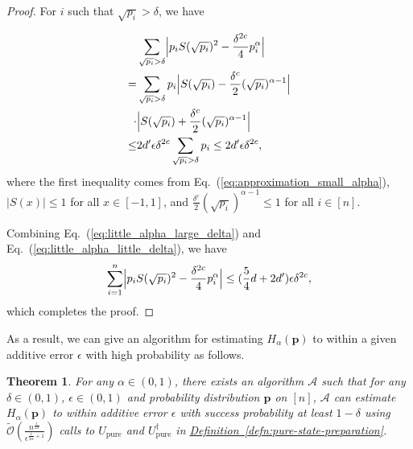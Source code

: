 \documentclass[journal]{IEEEtran}
\newtheorem{theorem}{Theorem}
\newcommand{\eq}[1]{Eq.~(\ref{eq:#1})}
\newcommand{\defn}[1]{\hyperref[defn:#1]{Definition~\ref*{defn:#1}}}
\begin{document}
\begin{proof}
  For $i$ such that $\sqrt{p_i} > \delta$, we have

    \begin{align}
      &\sum_{\sqrt{p_i} > \delta} \Bigl|p_iS(\sqrt{p_i})^2-\frac{\delta^{2c}}{4}p_i^{\alpha}\Bigr| \nonumber \\
      = &\sum_{\sqrt{p_i} > \delta} p_i\Bigl|S(\sqrt{p_i})-\frac{\delta^{c}}{2}(\sqrt{p_i})^{\alpha-1}\Bigr|\nonumber \\
      \cdot &\Bigl|S(\sqrt{p_i})+\frac{\delta^{c}}{2}(\sqrt{p_i})^{\alpha-1}\Bigr|
      \nonumber\\ \le & 2d'\epsilon\delta^{2c}\sum_{\sqrt{p_i} > \delta} p_i \le  2d'\epsilon\delta^{2c},
    \end{align}
    \label{eq:little_alpha_large_delta}
  where the first inequality comes from \eq{approximation_small_alpha}, $|S(x)|\le 1$ for all $x\in[-1,1]$, and $\frac{\delta^{c}}{2}(\sqrt{p_i})^{\alpha-1}\le 1$ for all $i\in[n]$.

  Combining \eq{little_alpha_large_delta} and \eq{little_alpha_little_delta}, we have
  \begin{align}
      \sum_{i=1}^n \Bigl|p_iS(\sqrt{p_i})^2-\frac{\delta^{2c}}{4}p_i^{\alpha}\Bigr| \le (\frac{5}{4}d + 2d')\epsilon \delta^{2c},
  \end{align}
  which completes the proof.
\end{proof}

As a result, we can give an algorithm for estimating $H_{\alpha}(\mathbf{p})$ to within a given additive error $\epsilon$ with high probability as follows. 
\begin{theorem}\label{thm:main-alpha-small}
  For any $\alpha \in(0,1)$, there exists an algorithm $\mathcal{A}$ such that for any $\delta \in (0,1)$, $\epsilon\in(0,1)$ and probability distribution $\mathbf{p}$ on $[n]$, $\mathcal{A}$ can estimate $H_{\alpha}(\mathbf{p})$ to within additive error $\epsilon$
  with success probability at least $1-\delta$ using $ \widetilde{\mathcal{O}}\left(\frac{n^{\frac{1}{2\alpha}}}{\epsilon^{\frac{1}{2\alpha}+1}}\right)$ calls to $U_{\mathrm{pure}}$ and $U_{\mathrm{pure}}^{\dagger}$ in \defn{pure-state-preparation}. 
\end{theorem}
\end{document}
